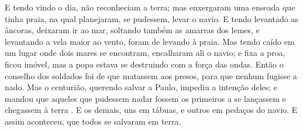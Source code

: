 {E tendo vindo o dia, não reconheciam a terra; mas enxergaram uma enseada que tinha praia, na qual planejaram, se pudessem, levar o navio.
E tendo levantado as âncoras, deixaram
{} ir ao mar, soltando também as amarras dos lemes, e levantando a vela maior ao vento, foram de levando
{} à praia.
Mas tendo caído em um lugar onde dois mares se encontram, encalharam ali o navio; e fixa a proa, ficou imóvel, mas a popa estava se destruindo com a força das ondas.
Então o conselho dos soldados foi de que matassem aos presos, para que nenhum
{} fugisse a nado.
Mas o centurião, querendo salvar a Paulo, impediu a intenção deles; e mandou que aqueles que pudessem nadar fossem os primeiros a se lançassem
{} e chegassem à terra
{} .
E
{} os demais, uns em tábuas, e outros em pedaços do navio. E assim aconteceu, que todos se salvaram em terra.

}
